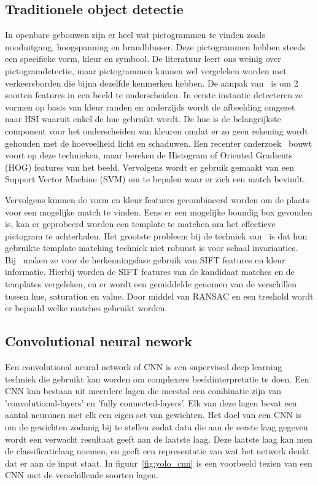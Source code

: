         \subsection{Traditionele object detectie}
            In openbare gebouwen zijn er heel wat pictogrammen te vinden zoals nooduitgang, hoogspanning en brandblusser. Deze pictogrammen hebben steeds een specifieke vorm, kleur en symbool.
            De literatuur leert ons weinig over pictogramdetectie, maar pictogrammen kunnen wel vergeleken worden met verkeersborden die bijna dezelfde kenmerken hebben.
            De aanpak van~\cite{Fang2003} is om 2 soorten features in een beeld te onderscheiden. In eerste instantie detecteren ze vormen op basis van kleur randen en anderzijds wordt de
            afbeelding omgezet naar HSI waaruit enkel de hue gebruikt wordt. De hue is de belangrijkste component voor het onderscheiden van kleuren omdat er zo geen rekening wordt gehouden
            met de hoeveelheid licht en schaduwen.
            Een recenter onderzoek~\cite{Zabihi2017} bouwt voort op deze technieken,
            maar bereken de Histogram of Oriented Gradients (HOG) features van het beeld. Vervolgens wordt er gebruik gemaakt van een Support Vector Machine (SVM) om te bepalen waar er zich een match bevindt.

            Vervolgens kunnen de vorm en kleur features gecombineerd worden om de plaats voor een mogelijke match te vinden. Eens er een mogelijke boundig box gevonden is,
            kan er geprobeerd worden een template te matchen om het effectieve pictogram te achterhalen. Het grootste probleem bij de techniek van~\cite{Fang2003} is
            dat hun gebruikte template matching techniek niet robuust is voor schaal invarianties.
            Bij~\cite{Zabihi2017} maken ze voor de herkenningsfase gebruik van SIFT\cite{Lowe1999} features en kleur informatie. 
            Hierbij worden de SIFT features van de kandidaat matches en de templates vergeleken, en er wordt een gemiddelde genomen van de verschillen tussen hue, saturation en value.
            Door middel van RANSAC en een treshold wordt er bepaald welke matches gebruikt worden.

        
        \subsection{Convolutional neural nework}
            Een convolutional neural network of CNN is een supervised deep learning techniek die gebruikt kan worden om complexere beeldinterpretatie te doen.
            Een CNN kan bestaan uit meerdere lagen die meestal een combinatie zijn van 'convolutional-layers' en 'fully connected-layers'. Elk van deze lagen bevat een aantal neuronen met elk een eigen set van gewichten.
            Het doel van een CNN is om de gewichten zodanig bij te stellen zodat data die aan de eerste laag gegeven wordt een verwacht resultaat geeft aan de laatste laag. 
            Deze laatste laag kan men de classificatielaag noemen, en geeft een representatie van wat het netwerk denkt dat er aan de input staat. In figuur~\ref{fig:yolo_cnn} is een voorbeeld tezien van een CNN met de verschillende soorten lagen.

